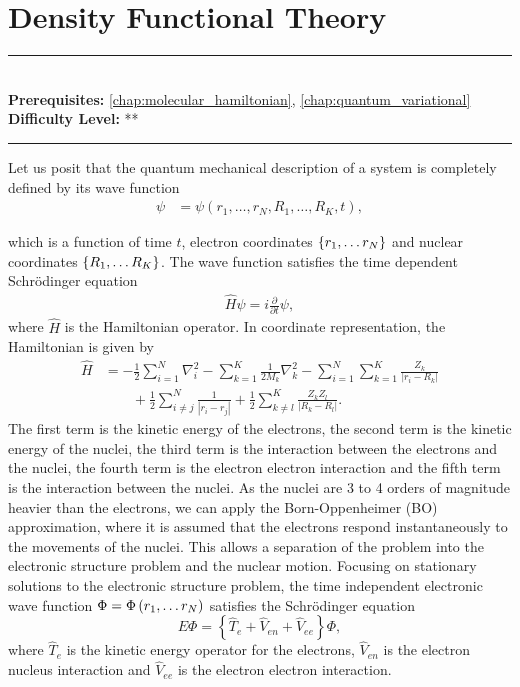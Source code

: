 \documentclass[book.tex]{subfiles}
\begin{document}
\chapter{Density Functional Theory}

\label{chap:dft}
\noindent\rule{11cm}{0.4pt} \\
\textbf{Prerequisites:} \autoref{chap:molecular_hamiltonian}, \autoref{chap:quantum_variational}  \\
\textbf{Difficulty Level:} ** \\
\noindent\rule{11cm}{0.4pt}
\vspace{5mm}



Let us posit that the quantum mechanical description of a system is completely defined by its wave function 
\begin{align}
\psi &= \psi\left(r_1,\dotsc, r_N, R_1,\dotsc, R_K, t \right),
\end{align}

which is a function of time $t$, electron coordinates $\left\{ r_1, \ldots r_N \right\}$ and nuclear coordinates $\left\{ R_1, \ldots R_K \right\}$.
The wave function satisfies the time dependent Schr\"{o}dinger equation
\begin{align}
\hat{H} \psi = i \frac{\partial}{\partial t} \psi , 
\end{align}
where $\hat{H}$ is the Hamiltonian operator. In coordinate representation, the Hamiltonian is given by
\begin{align}
\hat{H} &=
-\frac{1}{2}\sum_{i=1}^{N} \nabla _i^2
-\sum_{k=1} ^{K} \frac{1}{2M_k} \nabla _k^2
-\sum_{i=1}^{N} \sum_{k=1} ^{K} \frac{Z_k}{\left|r_i -R_k\right|} \\
& \qquad 
+\frac{1}{2} \sum_{i\neq j}^N\frac{1}{\left|r_i -r_j\right|} 
+\frac{1}{2} \sum_{k\neq l}^K\frac{Z_k Z_l}{\left|R_k -R_l\right|}. 
\end{align}
The first term is the kinetic energy of the electrons, the second term is the kinetic energy of the nuclei, the third term is the interaction between the electrons and the nuclei, the fourth term is the electron electron interaction and the fifth term is the interaction between the nuclei.
As the nuclei are 3 to 4 orders of magnitude heavier than the electrons, we can apply the Born-Oppenheimer (BO) approximation,
 where it is assumed that the electrons respond instantaneously to the movements of
the nuclei. This allows a separation of the problem into the electronic structure problem and the nuclear motion. Focusing on stationary solutions to the electronic structure problem, the time independent electronic wave function $\Phi = \Phi \left( r_1, \ldots r_N \right)$ satisfies the Schr\"{o}dinger equation
\begin{equation}
E \Phi = \left\{ \hat{T}_e +\hat{V}_{en} + \hat{V}_{ee} \right\} \Phi , 
\end{equation}
where $\hat{T}_e$ is the kinetic energy operator for the electrons, $\hat{V}_{en}$ is the electron nucleus interaction and $\hat{V}_{ee}$ is the electron electron interaction.
\end{document}
